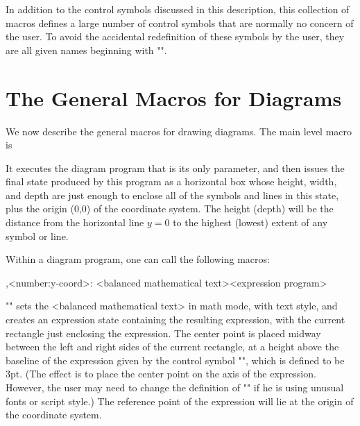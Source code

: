 \documentclass[11pt]{article}
\begin{document}
In addition to the control symbols discussed in this description, this
collection of macros defines a large number of control symbols that are
normally no concern of the user.  To avoid the accidental redefinition
of these symbols by the user, they are all given names beginning with "\zz".

\cleardoublepage
\section{The General Macros for Diagrams}

We now describe the general macros for drawing diagrams. The main level
macro is
\begin{myverb}
\end{myverb}
It executes the diagram program that is its only parameter, and then issues
the final state produced by this program as a horizontal box whose height,
width, and depth are just enough to enclose all of the symbols and lines
in this state, plus the origin (0,0) of the coordinate system.  The height
(depth) will be the distance from the horizontal line $y=0$ to the highest
(lowest) extent of any symbol or line.

Within a diagram program, one can call the following macros:
\begin{myverb}
    ,<number:y-coord>:
        {<balanced mathematical text>}{<expression program>}
\end{myverb}
"\vertex" sets the <balanced mathematical text> in math mode, with text style,
and creates an expression state containing the resulting expression, with
the current rectangle just enclosing the expression.  The center point is
placed midway between the left and right sides of the current rectangle,
at a height above the baseline of the expression given by the control
symbol "\centerheight", which is defined to be 3pt.  (The effect is to place
the center point on the axis of the expression.  However, the user may need
to change the definition of "\centerheight" if he is using unusual fonts or
script style.)  The reference point of the expression will lie at the
origin of the coordinate system.
\end{document}
